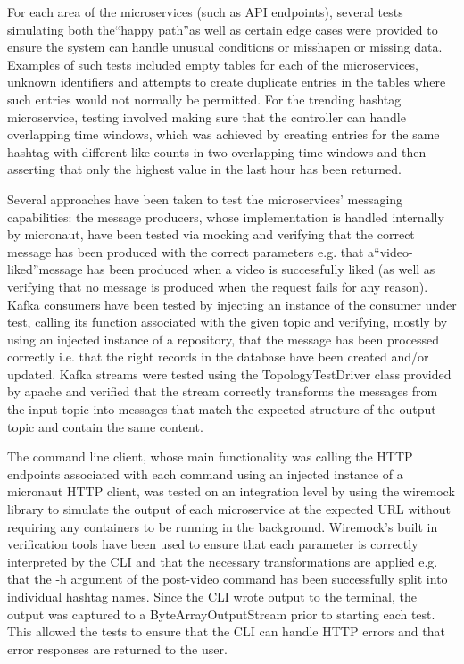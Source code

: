 \documentclass[parskip=full]{article}
\begin{document}
For each area of the microservices (such as API endpoints), several tests simulating both the``happy path''as well as certain edge cases were provided to ensure the system can handle unusual conditions or misshapen or missing data.
Examples of such tests included empty tables for each of the microservices, unknown identifiers and attempts to create duplicate entries in the tables where such entries would not normally be permitted.
For the trending hashtag microservice, testing involved making sure that the controller can handle overlapping time windows, which was achieved by creating entries for the same hashtag with different like counts in two overlapping time windows and then asserting that only the highest value in the last hour has been returned.

Several approaches have been taken to test the microservices' messaging capabilities: the message producers, whose implementation is handled internally by micronaut, have been tested via mocking and verifying that the correct message has been produced with the correct parameters e.g. that a``video-liked''message has been produced when a video is successfully liked (as well as verifying that no message is produced when the request fails for any reason).
Kafka consumers have been tested by injecting an instance of the consumer under test, calling its function associated with the given topic and verifying, mostly by using an injected instance of a repository, that the message has been processed correctly i.e. that the right records in the database have been created and/or updated.
Kafka streams were tested using the TopologyTestDriver class provided by apache and verified that the stream correctly transforms the messages from the input topic into messages that match the expected structure of the output topic and contain the same content.

The command line client, whose main functionality was calling the HTTP endpoints associated with each command using an injected instance of a micronaut HTTP client, was tested on an integration level by using the wiremock library to simulate the output of each microservice at the expected URL without requiring any containers to be running in the background.
Wiremock's built in verification tools have been used to ensure that each parameter is correctly interpreted by the CLI and that the necessary transformations are applied e.g. that the -h argument of the post-video command has been successfully split into individual hashtag names.
Since the CLI wrote output to the terminal, the output was captured to a ByteArrayOutputStream prior to starting each test.
This allowed the tests to ensure that the CLI can handle HTTP errors and that error responses are returned to the user.
\end{document}
